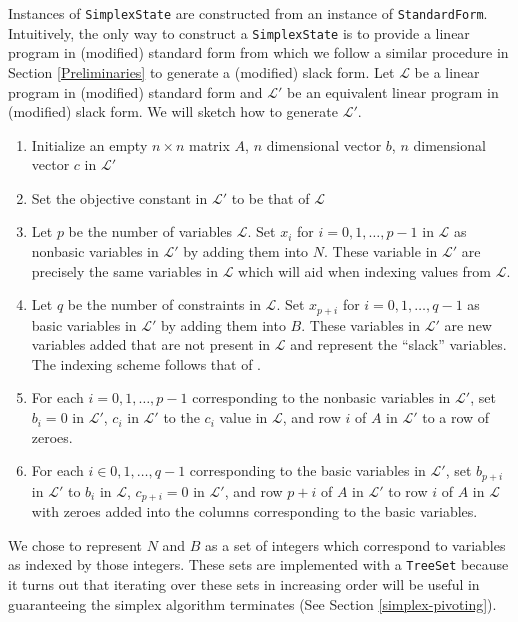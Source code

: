 \documentclass{article}
\newcommand{\javaCode}[1]{\texttt{#1}}
\begin{document}
Instances of \javaCode{SimplexState} are constructed from an instance of \javaCode{StandardForm}. Intuitively, the only way to construct a \javaCode{SimplexState} is to provide a linear program in (modified) standard form from which we follow a similar procedure in Section \ref{Preliminaries} to generate a (modified) slack form. Let $\mathcal{L}$ be a linear program in (modified) standard form and $\mathcal{L}'$ be an equivalent linear program in (modified) slack form. We will sketch how to generate $\mathcal{L}'$.
\begin{enumerate}
    \item Initialize an empty $n \times n$ matrix $A$, $n$ dimensional vector $b$, $n$ dimensional vector $c$ in $\mathcal{L}'$
    \item Set the objective constant in $\mathcal{L}'$ to be that of $\mathcal{L}$
    \item Let $p$ be the number of variables $\mathcal{L}$. Set $x_i$ for $i = 0, 1, \ldots, p-1$ in $\mathcal{L}$ as nonbasic variables in $\mathcal{L}'$ by adding them into $N$. These variable in $\mathcal{L}'$ are precisely the same variables in $\mathcal{L}$ which will aid when indexing values from $\mathcal{L}$. 
    \item Let $q$ be the number of constraints in $\mathcal{L}$. Set $x_{p + i}$ for $i = 0, 1, \ldots, q-1$ as basic variables in $\mathcal{L}'$ by adding them into $B$. These variables in $\mathcal{L}'$ are new variables added that are not present in $\mathcal{L}$ and represent the ``slack'' variables. The indexing scheme follows that of \cite{CLRS}.
    \item For each $i = 0, 1, \ldots, p-1$ corresponding to the nonbasic variables in $\mathcal{L}'$, set $b_i = 0$ in $\mathcal{L}'$, $c_i$ in $\mathcal{L}'$ to the $c_i$ value in $\mathcal{L}$, and row $i$ of $A$ in $\mathcal{L}'$ to a row of zeroes. 
    \item For each $i \in 0, 1, \ldots, q-1$ corresponding to the basic variables in $\mathcal{L}'$, set $b_{p+i}$ in $\mathcal{L}'$ to $b_i$ in $\mathcal{L}$, $c_{p+i} = 0$ in $\mathcal{L}'$, and row $p + i$ of $A$ in $\mathcal{L}'$ to row $i$ of $A$ in $\mathcal{L}$ with zeroes added into the columns corresponding to the basic variables.
\end{enumerate}
We chose to represent $N$ and $B$ as a set of integers which correspond to variables as indexed by those integers. These sets are implemented with a \javaCode{TreeSet} because it turns out that iterating over these sets in increasing order will be useful in guaranteeing the simplex algorithm terminates (See Section \ref{simplex-pivoting}).
\end{document}
